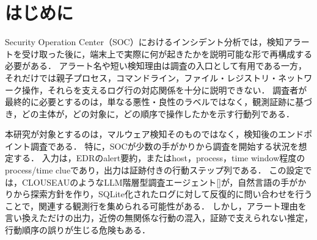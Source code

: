 \documentclass[dvipdfmx]{FITpaper}
\makeatletter
\renewcommand{\cite}[1]{[\@nameuse{cite@#1}]}
\makeatother
\begin{document}






\maketitle



\section{はじめに}

Security Operation Center（SOC）におけるインシデント分析では，検知アラートを受け取った後に，端末上で実際に何が起きたかを説明可能な形で再構成する必要がある．
アラート名や短い検知理由は調査の入口として有用である一方，それだけでは親子プロセス，コマンドライン，ファイル・レジストリ・ネットワーク操作，それらを支えるログ行の対応関係を十分に説明できない．
調査者が最終的に必要とするのは，単なる悪性・良性のラベルではなく，観測証跡に基づき，どの主体が，どの対象に，どの順序で操作したかを示す行動列である．

本研究が対象とするのは，マルウェア検知そのものではなく，検知後のエンドポイント調査である．
特に，SOCが少数の手がかりから調査を開始する状況を想定する．
入力は，EDRのalert要約，またはhost，process，time window程度のprocess/time clueであり，出力は証跡付きの行動ステップ列である．
この設定では，CLOUSEAUのようなLLM階層型調査エージェント\cite{clouseau}が，自然言語の手がかりから探索方針を作り，SQLite化されたログに対して反復的に問い合わせを行うことで，関連する観測行を集められる可能性がある．
しかし，アラート理由を言い換えただけの出力，近傍の無関係な行動の混入，証跡で支えられない推定，行動順序の誤りが生じる危険もある．
\end{document}
